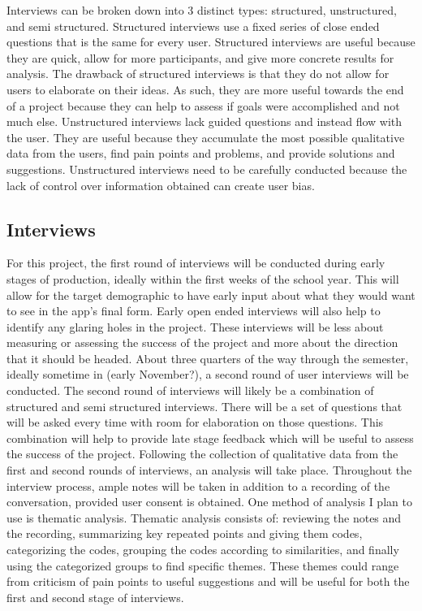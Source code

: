 \documentclass[10pt,twocolumn]{article}
\begin{document}
	Interviews can be broken down into 3 distinct types: structured, unstructured, and semi structured. Structured interviews use a fixed series of close ended questions that is the same for every user. Structured interviews are useful because they are quick, allow for more participants, and give more concrete results for analysis. The drawback of structured interviews is that they do not allow for users to elaborate on their ideas. As such, they are more useful towards the end of a project because they can help to assess if goals were accomplished and not much else.  Unstructured interviews lack guided questions and instead flow with the user. They are useful because they accumulate the most possible qualitative data from the users, find pain points and problems, and provide solutions and suggestions. Unstructured interviews need to be carefully conducted because the lack of control over information obtained can create user bias.

\subsection{Interviews}

	For this project, the first round of interviews will be conducted during early stages of production, ideally within the first weeks of the school year. This will allow for the target demographic to have early input about what they would want to see in the app’s final form. Early open ended interviews will also help to identify any glaring holes in the project. These interviews will be less about measuring or assessing the success of the project and more about the direction that it should be headed. 
About three quarters of the way through the semester, ideally sometime in (early November?), a second round of user interviews will be conducted. The second round of interviews will likely be a combination of structured and semi structured interviews. There will be a set of questions that will be asked every time with room for elaboration on those questions. This combination will help to provide late stage feedback which will be useful to assess the success of the project. 
Following the collection of qualitative data from the first and second rounds of interviews, an analysis will take place. Throughout the interview process, ample notes will be taken in addition to a recording of the conversation, provided user consent is obtained. One method of analysis I plan to use is thematic analysis. Thematic analysis consists of: reviewing the notes and the recording, summarizing key repeated points and giving them codes, categorizing the codes, grouping the codes according to similarities, and finally using the categorized groups to find specific themes. These themes could range from criticism of pain points to useful suggestions and will be useful for both the first and second stage of interviews. 
\end{document}
